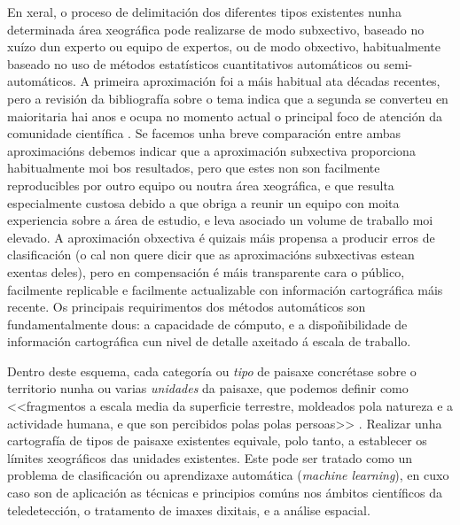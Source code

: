 \documentclass[11pt,a4paper]{article}
\begin{document}
En xeral, o proceso de delimitación dos diferentes tipos existentes nunha determinada área xeográfica pode realizarse de modo subxectivo, baseado no xuízo dun experto ou equipo de expertos, ou de modo obxectivo, habitualmente baseado no uso de métodos estatísticos cuantitativos automáticos ou semi-automáticos. A primeira aproximación foi a máis habitual ata décadas recentes, pero a revisión da bibliografía sobre o tema indica que a segunda se converteu en maioritaria hai anos e ocupa no momento actual o principal foco de atención da comunidade científica \citep{Mucher201087,Jasiewicz2014104}. Se facemos unha breve comparación entre ambas aproximacións debemos indicar que a aproximación subxectiva proporciona habitualmente moi bos resultados, pero que estes non son facilmente reproducibles por outro equipo ou noutra área xeográfica, e que resulta especialmente custosa debido a que obriga a reunir un equipo con moita experiencia sobre a área de estudio, e leva asociado un volume de traballo moi elevado. A aproximación obxectiva é quizais máis propensa a producir erros de clasificación (o cal non quere dicir que as aproximacións subxectivas estean exentas deles), pero en compensación é máis transparente cara o público, facilmente replicable e facilmente actualizable con información cartográfica máis recente. Os principais requirimentos dos métodos automáticos son fundamentalmente dous: a capacidade de cómputo, e a dispoñibilidade de información cartográfica cun nivel de detalle axeitado á escala de traballo.





Dentro deste esquema, cada categoría ou \emph{tipo} de paisaxe concrétase sobre o territorio nunha ou varias \emph{unidades} da paisaxe, que podemos definir como <<fragmentos a escala media da superficie terrestre, moldeados pola natureza e a actividade humana, e que son percibidos polas polas persoas>> \citep{Kienast2015136}. Realizar unha cartografía de tipos de paisaxe existentes equivale, polo tanto, a establecer os límites xeográficos das unidades existentes. Este pode ser tratado como un problema de clasificación ou aprendizaxe automática (\emph{machine learning}), en cuxo caso son de aplicación as técnicas e principios comúns nos ámbitos científicos da teledetección, o tratamento de imaxes dixitais, e a análise espacial. 
\end{document}
